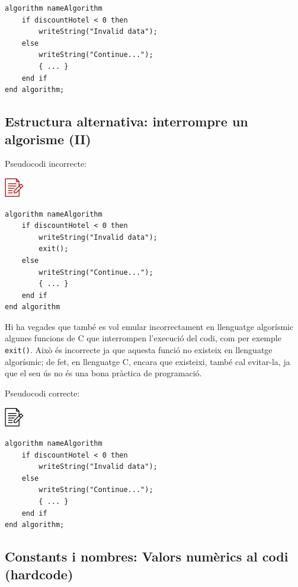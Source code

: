 \documentclass[
]{book}
\begin{document}
\begin{verbatim}
algorithm nameAlgorithm
    if discountHotel < 0 then
        writeString("Invalid data");
    else
        writeString("Continue...");
        { ... }
    end if
end algorithm;
\end{verbatim}

\hypertarget{estructura-alternativa-interrompre-un-algorisme-ii}{%
\subsection{Estructura alternativa: interrompre un algorisme (II)}\label{estructura-alternativa-interrompre-un-algorisme-ii}}

Pseudocodi incorrecte:

\includegraphics{./img/alg_err.png}

\begin{verbatim}
algorithm nameAlgorithm
    if discountHotel < 0 then
        writeString("Invalid data");
        exit();
    else
        writeString("Continue...");
        { ... }
    end if
end algorithm
\end{verbatim}

Hi ha vegades que també es vol emular incorrectament en llenguatge algorísmic algunes funcions de C que interrompen l'execució del codi, com per exemple \texttt{exit()}. Això és incorrecte ja que aquesta funció no existeix en llenguatge algorísmic; de fet, en llenguatge C, encara que existeixi, també cal evitar-la, ja que el seu ús no és una bona pràctica de programació.

Pseudocodi correcte:

\includegraphics{./img/alg.png}

\begin{verbatim}
algorithm nameAlgorithm
    if discountHotel < 0 then
        writeString("Invalid data");
    else
        writeString("Continue...");
        { ... }
    end if
end algorithm;
\end{verbatim}

\hypertarget{constants-i-nombres-valors-numuxe8rics-al-codi-hardcode}{%
\subsection{Constants i nombres: Valors numèrics al codi (hardcode)}\label{constants-i-nombres-valors-numuxe8rics-al-codi-hardcode}}
\end{document}
